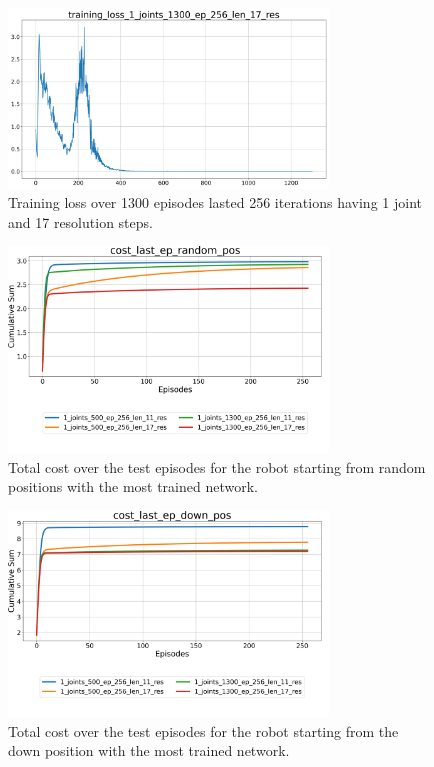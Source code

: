 \documentclass[twocolumn, a4paper]{article}
\begin{document}
\begin{figure}[H]
	\centering
	\includegraphics[width=8.5cm]{"../Figures/training_loss_1J_1300E_256EL_17RES.png"}
	\caption{Training loss over 1300 episodes lasted 256 iterations having 1
			 joint and 17 resolution steps.}
	\label{fig:TrainLoss_1_1300_17}
\end{figure}
\vspace{-1cm}
\begin{figure}[H]
	\centering
	\includegraphics[width=8.5cm]{"../Figures/Summary_cost_last_ep_random_pos_1J.png"}
	\caption{Total cost over the test episodes for the robot starting
			 from random positions with the most trained network.}
	\label{fig:Test_1_last_ep_random_pos}
\end{figure}

\begin{figure}[H]
	\centering
	\includegraphics[width=8.5cm]{"../Figures/Summary_cost_last_ep_down_pos_1J.png"}
	\caption{Total cost over the test episodes for the robot starting
			 from the down position with the most trained network.}
	\label{fig:Test_1_last_ep_down_pos}
\end{figure}
\end{document}
